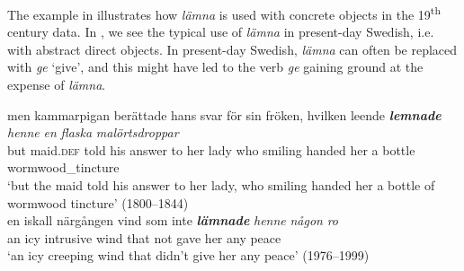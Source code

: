 \documentclass[output=paper]{langscibook}
\begin{document}
\begin{table}
\caption{Frequency measures of the verb-specific DOC with \textit{lämna} ‘hand’\label{tab:valdeson:10}}
\end{table}

The example in  illustrates how \textit{lämna} is used with concrete objects in the 19\textsuperscript{th} century data. In , we see the typical use of \textit{lämna} in present-day Swedish, i.e. with abstract direct objects. In present-day Swedish‚ \textit{lämna} can often be replaced with \textit{ge} ‘give’, and this might have led to the verb \textit{ge} gaining ground at the expense of \textit{lämna}.


\ea \label{ex:valdeson:12}
\gll men kammarpigan   berättade  hans  svar     för     sin     fröken, hvilken leende \textbf{\textit{lemnade}} \textit{henne}  \textit{en}  \textit{flaska}    \textit{malörtsdroppar}\\
  but maid.\textsc{def}        told        his    answer  to  her   lady who       smiling    handed       her        a  bottle       wormwood\_tincture\\
\glt `but the maid told his answer to her lady, who smiling handed her a bottle of wormwood tincture’ (1800–1844)\\
\ex \label{ex:valdeson:13}
\gll en    iskall  närgången  vind   som    inte \textbf{\textit{lämnade}} \textit{henne}  \textit{någon}   \textit{ro}\\
  an   icy          intrusive     wind  that      not  gave      her   any  peace  \\
\glt `an icy creeping wind that didn’t give her any peace’ (1976–1999)
\z


\label{sec:valdeson:5.3.1.4}
\end{document}
